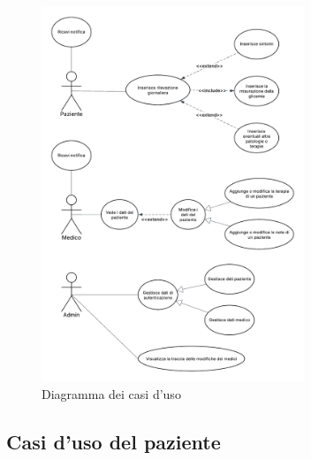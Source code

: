 \documentclass[a4paper]{article}
\begin{document}
\begin{figure}[H]
	\centering
	\includegraphics[width=0.7\textwidth]{usecase}
	\caption{Diagramma dei casi d'uso}
	\label{fig:usecase}
\end{figure}

\subsection{Casi d'uso del paziente}
\end{document}
